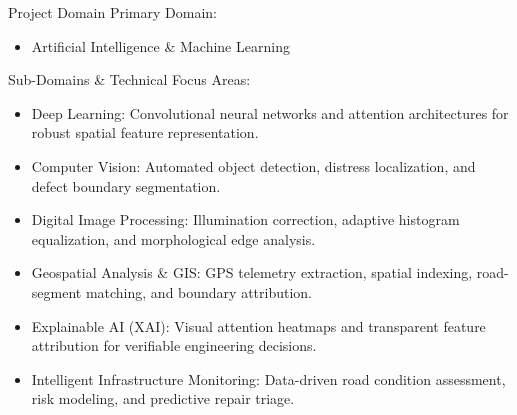 \documentclass[10pt]{beamer}
\def\textbf#1{#1}%
\def\large{}%
\def\begin#1{}%
\def\end#1{}%
\def\vspace#1{}%
\begin{document}
\begin{frame}{Project Domain}
    \textbf{\large Primary Domain:}
    \vspace{0.2em}
    \begin{itemize}
        \item \textbf{Artificial Intelligence \& Machine Learning}
    \end{itemize}
    \vspace{0.4em}
    \textbf{\large Sub-Domains \& Technical Focus Areas:}
    \vspace{0.2em}
    \begin{itemize}
        \setlength{\itemsep}{0.45em}
        \item \textbf{Deep Learning:} Convolutional neural networks and attention architectures for robust spatial feature representation.
        \item \textbf{Computer Vision:} Automated object detection, distress localization, and defect boundary segmentation.
        \item \textbf{Digital Image Processing:} Illumination correction, adaptive histogram equalization, and morphological edge analysis.
        \item \textbf{Geospatial Analysis \& GIS:} GPS telemetry extraction, spatial indexing, road-segment matching, and boundary attribution.
        \item \textbf{Explainable AI (XAI):} Visual attention heatmaps and transparent feature attribution for verifiable engineering decisions.
        \item \textbf{Intelligent Infrastructure Monitoring:} Data-driven road condition assessment, risk modeling, and predictive repair triage.
    \end{itemize}
\end{frame}
\end{document}
